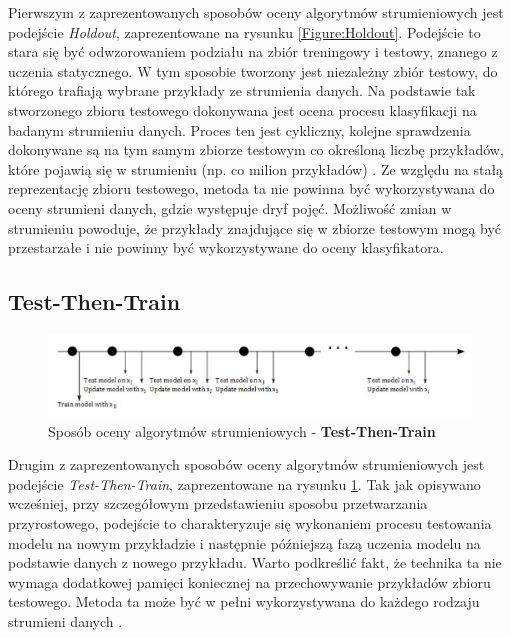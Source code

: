 \noindent Pierwszym z zaprezentowanych sposobów oceny algorytmów strumieniowych jest podejście \textit{Holdout}, zaprezentowane na rysunku \ref{Figure:Holdout}. Podejście to stara się być odwzorowaniem podziału na zbiór treningowy i testowy, znanego z uczenia statycznego. W tym sposobie tworzony jest niezależny zbiór testowy, do którego trafiają wybrane przykłady ze strumienia danych. Na podstawie tak stworzonego zbioru testowego dokonywana jest ocena procesu klasyfikacji na badanym strumieniu danych. Proces ten jest cykliczny, kolejne sprawdzenia dokonywane są na tym samym zbiorze testowym co określoną liczbę przykładów, które pojawią się w strumieniu (np. co milion przykładów) \cite{PHD:Kirkby}. Ze względu na stałą reprezentację zbioru testowego, metoda ta nie powinna być wykorzystywana do oceny strumieni danych, gdzie występuje dryf pojęć. Możliwość zmian w strumieniu powoduje, że przykłady znajdujące się w zbiorze testowym mogą być przestarzałe i nie powinny być wykorzystywane do oceny klasyfikatora.

\subsection{Test-Then-Train}
\label{Secton:TestThenTrain}

\begin{figure}[h] 
    \centering
    \includegraphics[width=15cm]{figures/online_processing.JPG}
    \caption{Sposób oceny algorytmów strumieniowych - \textbf{Test-Then-Train} \cite{Prezentacja:Strumienie}}\label{Figure:TestThenTrain}
\end{figure}

\noindent Drugim z zaprezentowanych sposobów oceny algorytmów strumieniowych jest podejście \textit{Test-Then-Train}, zaprezentowane na rysunku \ref{Figure:TestThenTrain}. Tak jak opisywano wcześniej, przy szczegółowym przedstawieniu sposobu przetwarzania przyrostowego, podejście to charakteryzuje się wykonaniem procesu testowania modelu na nowym przykładzie i następnie późniejszą fazą uczenia modelu na podstawie danych z nowego przykładu. Warto podkreślić fakt, że technika ta nie wymaga dodatkowej pamięci koniecznej na przechowywanie przykładów zbioru testowego. Metoda ta może być w pełni wykorzystywana do każdego rodzaju strumieni danych \cite{PHD:Kirkby}.

